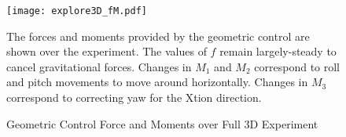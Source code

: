 \begin{figure}
	\centering
	\texttt{[image: explore3D\_fM.pdf]}
	\caption{Geometric Control Force and Moments over Full 3D Experiment}
	\medskip
	\small
	The forces and moments provided by the geometric control are shown over the experiment. The values of $f$ remain largely-steady to cancel gravitational forces. Changes in $M_1$ and $M_2$ correspond to roll and pitch movements to move around horizontally. Changes in $M_3$ correspond to correcting yaw for the Xtion direction.
	\label{fig:Explore3D_fM}
\end{figure}

